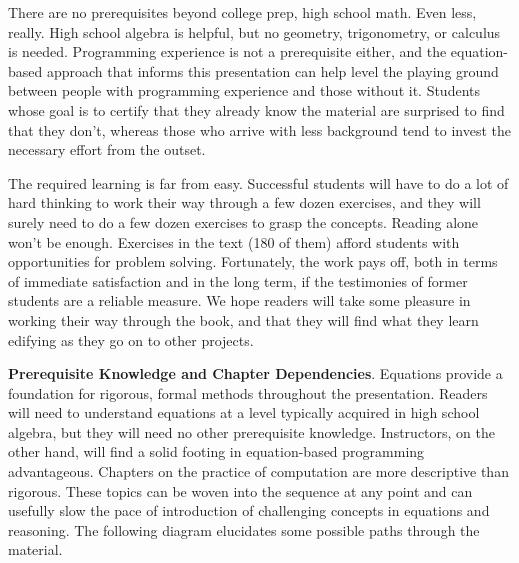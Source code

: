 \begin{preface}
There are no prerequisites beyond college prep, high school math.
Even less, really.
High school algebra is helpful,
but no geometry, trigonometry, or calculus is needed.
Programming experience is not a prerequisite either, and
the equation-based approach that informs this presentation can
help level the playing ground between people
with programming experience and those without it.
Students whose goal is to certify that they already
know the material are surprised to find that they don't,
whereas those who arrive with less background tend
to invest the necessary effort from the outset.

The required learning is far from easy.
Successful students will have to do a lot of hard thinking
to work their way through a few dozen exercises,
and they will surely need to do a few dozen exercises to grasp the concepts.
Reading alone won't be enough.
Exercises in the text (180 of them) afford students with opportunities
for problem solving.
Fortunately, the work pays off, both in terms of immediate satisfaction
and in the long term, if the testimonies of former students are a
reliable measure.
We hope readers will take some pleasure in working their way through
the book, and that they will find what they learn
edifying as they go on to other projects.

\vspace{0.5cm}
{\parindent0pt
\textbf{Prerequisite Knowledge and Chapter Dependencies}.
\label{ch:roadmap}
Equations provide a foundation
for rigorous, formal methods throughout the presentation.
Readers will need to understand equations at a level
typically acquired in high school algebra, but they will need
no other prerequisite knowledge.
Instructors, on the other hand, will find
a solid footing in equation-based programming advantageous.
Chapters on the practice of computation are more descriptive than rigorous.
These topics can be woven into the sequence at any point
and can usefully slow the pace of introduction
of challenging concepts in equations and reasoning.
The following diagram elucidates some possible
paths through the material.}
\\ %


\end{preface}
